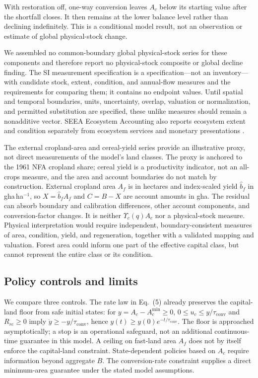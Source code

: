 \documentclass[preprint,12pt,authoryear]{elsarticle}
\newcommand{\Ups}{\Upsilon_c}
\newcommand{\Acmin}{A_c^{\min}}
\newcommand{\tconv}{\tau_{\mathrm{conv}}}
\begin{document}
With restoration off, one-way conversion leaves $A_c$ below its starting value after the shortfall closes. It then remains at the lower balance level rather than declining indefinitely. This is a conditional model result, not an observation or estimate of global physical-stock change.

We assembled no common-boundary global physical-stock series for these components and therefore report no physical-stock composite or global decline finding. The SI measurement specification is a specification—not an inventory—with candidate stock, extent, condition, and annual-flow measures and the requirements for comparing them; it contains no endpoint values. Until spatial and temporal boundaries, units, uncertainty, overlap, valuation or normalization, and permitted substitution are specified, these unlike measures should remain a nonadditive vector. SEEA Ecosystem Accounting also reports ecosystem extent and condition separately from ecosystem services and monetary presentations \citep{UN2021SEEA_EA}.

The external cropland-area and cereal-yield series provide an illustrative proxy, not direct measurements of the model's land classes. The proxy is anchored to the 1961 NFA cropland share; cereal yield is a productivity indicator, not an all-crops measure, and the area and account boundaries do not match by construction. External cropland area $A_f$ is in hectares and index-scaled yield $\hat b_f$ in gha\,ha$^{-1}$, so $X=\hat b_fA_f$ and $C=B-X$ are account amounts in gha. The residual can absorb boundary and calibration differences, other account components, and conversion-factor changes. It is neither $\Ups(q)A_c$ nor a physical-stock measure. Physical interpretation would require independent, boundary-consistent measures of area, condition, yield, and regeneration, together with a validated mapping and valuation. Forest area could inform one part of the effective capital class, but cannot represent the entire class or its condition.

\subsection{Policy controls and limits}

We compare three controls. The rate law in Eq.~(5) already preserves the capital-land floor from safe initial states: for $y=A_c-\Acmin\ge0$, $0\le u_c\le y/\tconv$ and $R_{rc}\ge0$ imply $\dot y\ge-y/\tconv$, hence $y(t)\ge y(0)e^{-t/\tconv}$. The floor is approached asymptotically; a stop is an operational safeguard, not an additional continuous-time guarantee in this model. A ceiling on fast-land area $A_f$ does not by itself enforce the capital-land constraint. State-dependent policies based on $A_c$ require information beyond aggregate $B$. The conversion-rate constraint supplies a direct minimum-area guarantee under the stated model assumptions.
\end{document}
